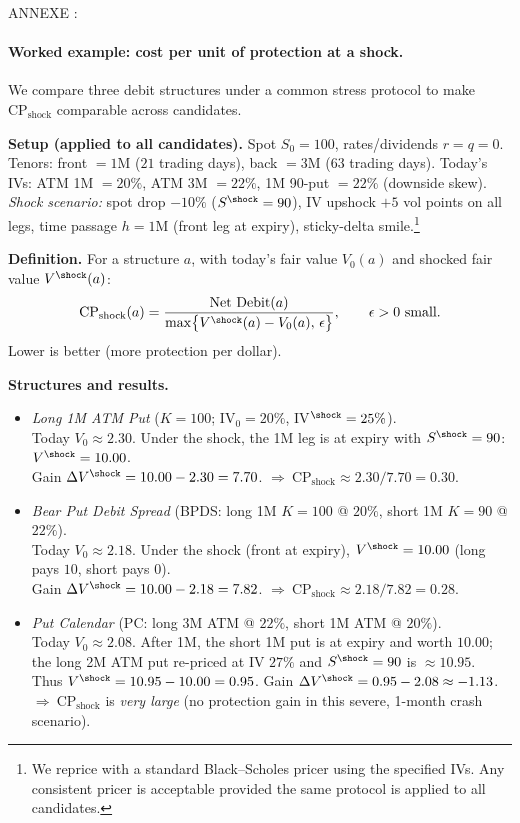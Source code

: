 \documentclass[12pt,a4paper]{report}
\begin{document}
ANNEXE : 

\paragraph{Worked example: cost per unit of protection at a shock.}
We compare three debit structures under a common stress protocol to make $\mathrm{CP}_{\text{shock}}$ comparable across candidates.

\medskip
\noindent\textbf{Setup (applied to all candidates).}
Spot $S_0=100$, rates/dividends $r=q=0$. Tenors: front $=1$M ($21$ trading days), back $=3$M ($63$ trading days).
Today’s IVs: ATM 1M $=20\%$, ATM 3M $=22\%$, 1M 90-put $=22\%$ (downside skew).
\emph{Shock scenario:} spot drop $-10\%$ ($S^{\shock}=90$), IV upshock $+5$ vol points on all legs, time passage $h=1$M (front leg at expiry), sticky-delta smile.\footnote{We reprice with a standard Black–Scholes pricer using the specified IVs. Any consistent pricer is acceptable provided the same protocol is applied to all candidates.}

\medskip
\noindent\textbf{Definition.}
For a structure $a$, with today’s fair value $V_0(a)$ and shocked fair value $V^{\shock}(a)$:
\[
\mathrm{CP}_{\text{shock}}(a)=\frac{\text{Net Debit}(a)}{\max\!\big\{V^{\shock}(a)-V_0(a),\,\epsilon\big\}},
\qquad \epsilon>0\text{ small.}
\]
Lower is better (more protection per dollar).

\medskip
\noindent\textbf{Structures and results.}
\begin{itemize}
  \item \emph{Long 1M ATM Put} ($K=100$; IV$_0=20\%$, IV$^{\shock}=25\%$). \\
  Today $V_0 \approx 2.30$. Under the shock, the 1M leg is at expiry with $S^{\shock}=90$: $V^{\shock}=10.00$. \\
  Gain $\Delta V^{\shock}=10.00-2.30=7.70$. \quad $\Rightarrow\ \mathrm{CP}_{\text{shock}} \approx 2.30/7.70 = \mathbf{0.30}$.
  \item \emph{Bear Put Debit Spread} (BPDS: long 1M $K=100$ @ $20\%$, short 1M $K=90$ @ $22\%$). \\
  Today $V_0 \approx 2.18$. Under the shock (front at expiry), $V^{\shock}=10.00$ (long pays $10$, short pays $0$). \\
  Gain $\Delta V^{\shock}=10.00-2.18=7.82$. \quad $\Rightarrow\ \mathrm{CP}_{\text{shock}} \approx 2.18/7.82 = \mathbf{0.28}$.
  \item \emph{Put Calendar} (PC: long 3M ATM @ $22\%$, short 1M ATM @ $20\%$). \\
  Today $V_0 \approx 2.08$. After 1M, the short 1M put is at expiry and worth $10.00$; the long 2M ATM put re-priced at IV $27\%$ and $S^{\shock}=90$ is $\approx 10.95$. \\
  Thus $V^{\shock}=10.95-10.00=0.95$. Gain $\Delta V^{\shock}=0.95-2.08\approx -1.13$. \\
  $\Rightarrow\ \mathrm{CP}_{\text{shock}}$ is \emph{very large} (no protection gain in this severe, 1-month crash scenario).
\end{itemize}
\end{document}
